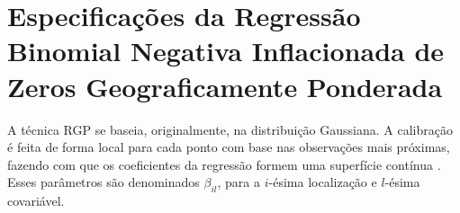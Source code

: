 \documentclass[12pt, a4paper, twoside]{report}
\numberwithin{equation}{section} %
\begin{document}
\section{Especificações da Regressão Binomial Negativa Inflacionada de Zeros Geograficamente Ponderada}\label{secao_3_2}







A técnica RGP se baseia, originalmente, na distribuição Gaussiana. A calibração é feita de forma local para cada ponto com base nas observações mais próximas, fazendo com que os coeficientes da regressão formem uma superfície contínua \citep{fotheringham2002}. Esses parâmetros são denominados $\beta_{il}$, para a $i$-ésima localização e $l$-ésima covariável.
\end{document}
